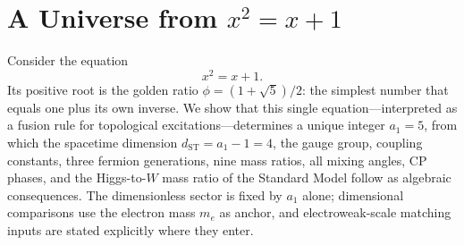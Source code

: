 \documentclass[12pt,a4paper]{article}
\theoremstyle{definition}
\begin{document}
\begin{abstract}
Galois invariance on $\mathbb{Z}[\phi]$ forces exactly three generations.  Nine fermion masses $m_f = m_e\,\phi^{5a+6b+\delta}$, with quantum numbers $(a,b)$ uniquely constructed from the McKay graph, achieve $\chi^2 = 2.2$ over 8~degrees of freedom ($p = 0.97$).  CKM and PMNS mixing angles, CP phases ($\delta_{\text{CKM}} = \arctan\sqrt{5}$, $\theta_{\text{QCD}} = 0$), the Higgs mass ratio $m_H^2/m_W^2 = \phi^2 - 16\alpha\phi$ (0.008\% using experimental $m_W$; 0.60\% using the framework's own $m_W$), and the hierarchy $m_e/m_P = \alpha^{4\phi^2}$ (0.24\%) are all derived within the stated assumptions.  On the 600-cell simplicial complex the finite spectral moments, Ollivier-flat graph curvature, and the exact fiber/cross edge-weight stiffness ratio $a_1^2=25$ are discrete results.  Their identification with continuum bosonic, gravitational, temporal, or Planck-scale physics remains open.

Galois conjugation $\phi \to -1/\phi$ generates a dark sector: nine stable, electromagnetically dark particles sharing the algebraic structure but lacking real gauge couplings.  The topological entanglement entropy difference between visible and dark sectors is exactly $\ln\phi$.

\emph{Falsifiable predictions:} $\sin^2\theta_{13} = 1/45$ (JUNO); $\sum m_\nu = 0.058$~eV (DESI/Euclid); $\delta_{\text{PMNS}} = 197.7^\circ$ (DUNE/Hyper-K); $m_H^2/m_W^2 = \phi^2 - 16\alpha\phi$ (FCC-ee).  Any single miss falsifies the entire framework.
\end{abstract}

\tableofcontents
\newpage


\section{A Universe from \texorpdfstring{$x^2 = x + 1$}{x2 = x + 1}}
\label{sec:integer}

Consider the equation
\begin{equation}
x^2 = x + 1.
\label{eq:selfreference}
\end{equation}
Its positive root is the golden ratio $\phi = (1+\sqrt{5})/2$: the simplest number that equals one plus its own inverse.  We show that this single equation---interpreted as a fusion rule for topological excitations---determines a unique integer $a_1 = 5$, from which the spacetime dimension $d_{\mathrm{ST}} = a_1 - 1 = 4$, the gauge group, coupling constants, three fermion generations, nine mass ratios, all mixing angles, CP phases, and the Higgs-to-$W$ mass ratio of the Standard Model follow as algebraic consequences.  The dimensionless sector is fixed by $a_1$ alone; dimensional comparisons use the electron mass $m_e$ as anchor, and electroweak-scale matching inputs are stated explicitly where they enter.
\end{document}
